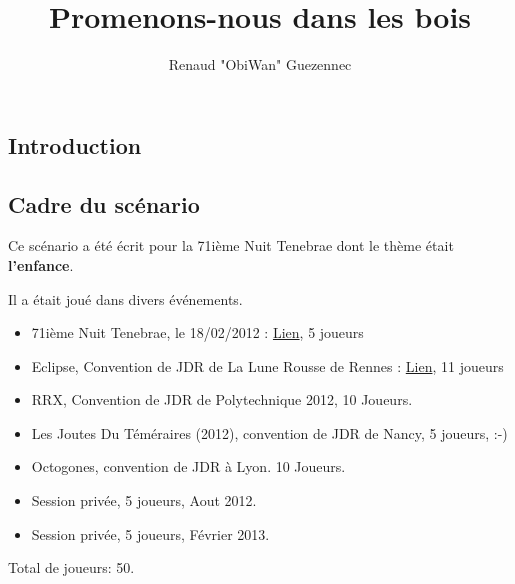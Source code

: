 \documentclass[oneside,12pt]{book}
\title{Promenons-nous dans les bois}
\author{Renaud "ObiWan" Guezennec}
\date{}
\begin{document}
\maketitle \clearpage
\tableofcontents \clearpage
\listoffigures \clearpage

\begin{flushleft}
    \chapter{Introduction}
    \section{Cadre du scénario}
    Ce scénario a été écrit pour la 71ième Nuit Tenebrae dont le thème était \textbf{l'enfance}. 
    
    Il a était joué dans divers événements. 
    \begin{itemize}
    \item 71ième Nuit Tenebrae, le 18/02/2012 : \href{http://www.tenebrae-mundis.com/les-nuits-tenebrae/teaser-de-la-71e-nuit-tenebrae}{Lien}, 5 joueurs
    \item Eclipse, Convention de JDR de La Lune Rousse de Rennes : \href{http://www.ascreb.org/clubs/jdr/convention/archives/eclipse10.php}{Lien}, 11 joueurs
    \item RRX, Convention de JDR de Polytechnique 2012, 10 Joueurs. 
    \item Les Joutes Du Téméraires (2012), convention de JDR de Nancy, 5 joueurs, :-)
    \item Octogones, convention de JDR à Lyon. 10 Joueurs.
    \item Session privée, 5 joueurs, Aout 2012.
    \item Session privée, 5 joueurs, Février 2013.
    \end{itemize}
    
    Total de joueurs: 50.


\end{flushleft}
\end{document}
